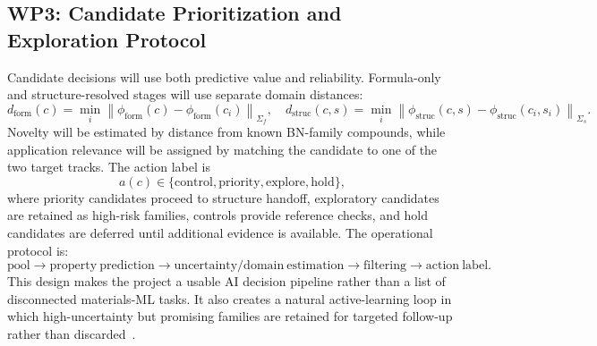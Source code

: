 \documentclass[10pt,a4paper]{article}
\newcommand{\domainf}{d_{\mathrm{form}}}
\newcommand{\domains}{d_{\mathrm{struc}}}
\begin{document}
\subsection{WP3: Candidate Prioritization and Exploration Protocol}
Candidate decisions will use both predictive value and reliability. Formula-only and structure-resolved stages will use separate domain distances:
\[
  \domainf(c)=\min_i\left\|\phi_{\mathrm{form}}(c)-\phi_{\mathrm{form}}(c_i)\right\|_{\Sigma_f},
  \quad
  \domains(c,s)=\min_i\left\|\phi_{\mathrm{struc}}(c,s)-\phi_{\mathrm{struc}}(c_i,s_i)\right\|_{\Sigma_s}.
\]
Novelty will be estimated by distance from known BN-family compounds, while application relevance will be assigned by matching the candidate to one of the two target tracks. The action label is
\[
  a(c)\in\{\mathrm{control},\mathrm{priority},\mathrm{explore},\mathrm{hold}\},
\]
where priority candidates proceed to structure handoff, exploratory candidates are retained as high-risk families, controls provide reference checks, and hold candidates are deferred until additional evidence is available. The operational protocol is:
\[
  \mathrm{pool}\rightarrow\mathrm{property\ prediction}\rightarrow
  \mathrm{uncertainty/domain\ estimation}\rightarrow
  \mathrm{filtering}\rightarrow\mathrm{action\ label}.
\]
This design makes the project a usable AI decision pipeline rather than a list of disconnected materials-ML tasks. It also creates a natural active-learning loop in which high-uncertainty but promising families are retained for targeted follow-up rather than discarded~\cite{lookman2019_active}.
\end{document}
